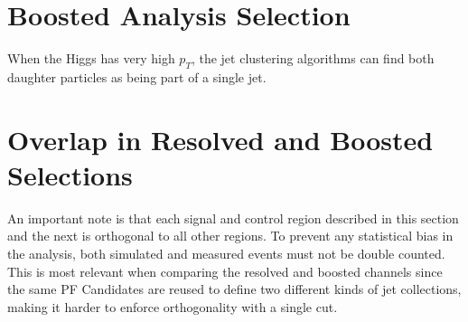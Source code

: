 \section{Boosted Analysis Selection}

When the Higgs has very high $p_T$,
the jet clustering algorithms can find both daughter particles
as being part of a single jet.

\section{Overlap in Resolved and Boosted Selections}

An important note is that each signal and control region described in this section and the next
is orthogonal to all other regions.
To prevent any statistical bias in the analysis,
both simulated and measured events must not be double counted.
This is most relevant when comparing the resolved and boosted channels since
the same PF Candidates are reused to define two different kinds of jet collections,
making it harder to enforce orthogonality with a single cut.
